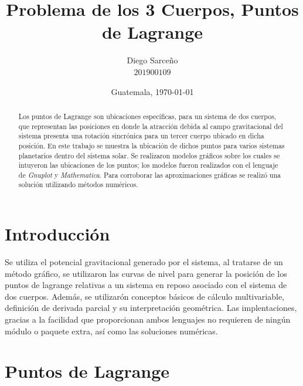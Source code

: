 







\title{\sc Problema de los 3 Cuerpos, Puntos de Lagrange}%
\author{Diego Sarceño \\ $201900109$}
\date{Guatemala, \today}

  
\maketitle

\begin{abstract}
  Los puntos de Lagrange son ubicaciones específicas, para un sistema de dos cuerpos, que representan las posiciones en donde la atracción debida al campo gravitacional del sistema presenta una rotación sincrónica para un tercer cuerpo ubicado en dicha posición. En este trabajo se muestra la ubicación de dichos puntos para varios sistemas planetarios dentro del sistema solar. Se realizaron modelos gráficos sobre los cuales se intuyeron las ubicaciones de los puntos; los modelos fueron realizados con el lenguaje de \textit{Gnuplot} y \textit{Mathematica}. Para corroborar las aproximaciones gráficas se realizó una solución utilizando métodos numéricos.
\end{abstract}


\section{Introducción}
\label{sec:intro}
\justify 
Se utiliza el potencial gravitacional generado por el sistema, al tratarse de un método gráfico, se utilizaron las curvas de nivel para generar la posición de los puntos de lagrange relativas a un sistema en reposo asociado con el sistema de dos cuerpos. Además, se utilizarón conceptos básicos de cálculo multivariable, definición de derivada parcial y su interpretación geométrica. Las implentaciones, gracias a la facilidad que proporcionan ambos lenguajes no requieren de ningún módulo o paquete extra, así como las soluciones numéricas.	


\section{Puntos de Lagrange}
